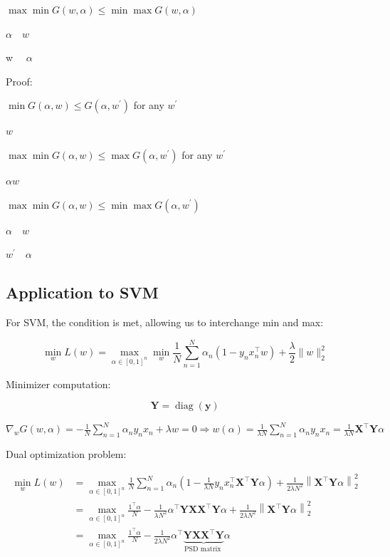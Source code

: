 $\max \min G(w, \alpha) \leq \min \max G(w, \alpha)$

$\alpha \quad w$

w $\quad \alpha$

Proof:

$\min G(\alpha, w) \leq G\left(\alpha, w^{\prime}\right)$ for any $w^{\prime}$

$w$

$\max \min G(\alpha, w) \leq \max G\left(\alpha, w^{\prime}\right)$ for any $w^{\prime}$

$\alpha w$

$\max \min G(\alpha, w) \leq \min \max G\left(\alpha, w^{\prime}\right)$

$\alpha \quad w$

$w^{\prime} \quad \alpha$

\subsection*{Application to SVM}
For SVM, the condition is met, allowing us to interchange min and max:

$$
\min _{w} L(w)=\max _{\alpha \in[0,1]^{n}} \min _{w} \frac{1}{N} \sum_{n=1}^{N} \alpha_{n}\left(1-y_{n} x_{n}^{\top} w\right)+\frac{\lambda}{2}\|w\|_{2}^{2}
$$

Minimizer computation:

$$
\mathbf{Y}=\operatorname{diag}(\mathbf{y})
$$

$\nabla_{w} G(w, \alpha)=-\frac{1}{N} \sum_{n=1}^{N} \alpha_{n} y_{n} x_{n}+\lambda w=0 \Longrightarrow w(\alpha)=\frac{1}{\lambda N} \sum_{n=1}^{N} \alpha_{n} y_{n} x_{n}=\frac{1}{\lambda N} \mathbf{X}^{\top} \mathbf{Y} \alpha$

Dual optimization problem:

$$
\begin{aligned}
\min _{w} L(w) & =\max _{\alpha \in[0,1]^{n}} \frac{1}{N} \sum_{n=1}^{N} \alpha_{n}\left(1-\frac{1}{\lambda N} y_{n} x_{n}^{\top} \mathbf{X}^{\top} \mathbf{Y} \alpha\right)+\frac{1}{2 \lambda N^{2}}\left\|\mathbf{X}^{\top} \mathbf{Y} \alpha\right\|_{2}^{2} \\
& =\max _{\alpha \in[0,1]^{n}} \frac{1^{\top} \alpha}{N}-\frac{1}{\lambda N^{2}} \alpha^{\top} \mathbf{Y} \mathbf{X} \mathbf{X}^{\top} \mathbf{Y} \alpha+\frac{1}{2 \lambda N^{2}}\left\|\mathbf{X}^{\top} \mathbf{Y} \alpha\right\|_{2}^{2} \\
& =\max _{\alpha \in[0,1]^{n}} \frac{1^{\top} \alpha}{N}-\frac{1}{2 \lambda N^{2}} \alpha^{\top} \underbrace{\mathbf{Y} \mathbf{X} \mathbf{X}^{\top} \mathbf{Y}}_{\text {PSD matrix }} \alpha
\end{aligned}
$$

